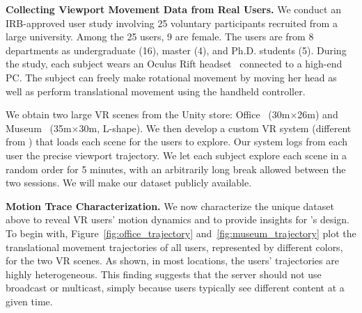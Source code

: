 \textbf{Collecting Viewport Movement Data from Real Users.} We conduct an IRB-approved user study involving 25 voluntary participants recruited from a large university. Among the 25 users, 9 are female. The users are from 8 departments as undergraduate (16), master (4), and Ph.D. students (5). %
During the study, each subject wears an Oculus Rift headset~\cite{rift} connected to a high-end PC. The subject can freely make rotational movement by moving her head as well as perform translational movement using the handheld controller.

We obtain two large VR scenes from the Unity store: Office~\cite{office} (30m$\times$26m) and Museum~\cite{museum} (35m$\times$30m, L-shape). We then develop a custom VR system (different from \firefly) that loads each scene for the users to explore. Our system logs from each user the precise viewport trajectory.
%
We let each subject explore each scene in a random order for 5 minutes, with an arbitrarily long break allowed between the two sessions.
%
We will make our dataset publicly available.

\textbf{Motion Trace Characterization.}
We now characterize the unique dataset above
to reveal VR users' motion dynamics and to provide insights for \firefly's design.
%
To begin with, Figure~\ref{fig:office_trajectory} and~\ref{fig:museum_trajectory} plot the translational movement trajectories of all users, represented by different colors, for the two VR scenes.
%
As shown, in most locations, the users' trajectories are highly heterogeneous.
This finding suggests that the server should not use broadcast or multicast, simply because users typically see different content at a given time.

